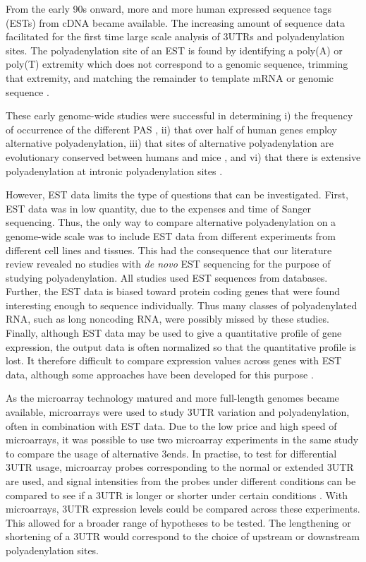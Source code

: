 From the early 90s onward, more and more human expressed sequence tags (ESTs)
from cDNA became available. The increasing amount of sequence data facilitated
for the first time large scale analysis of 3\p UTRs and polyadenylation sites.
The polyadenylation site of an EST is found by identifying a poly(A) or poly(T)
extremity which does not correspond to a genomic sequence, trimming that
extremity, and matching the remainder to template mRNA or genomic sequence
\cite{beaudoing_patterns_2000, tian_large-scale_2005}.

These early genome-wide studies were successful in determining i) the frequency
of occurrence of the different PAS \cite{beaudoing_patterns_2000}, ii) that
over half of human genes employ alternative polyadenylation, iii) that sites of
alternative polyadenylation are evolutionary conserved between humans and mice
\cite{tian_large-scale_2005}, and vi) that there is extensive polyadenylation
at intronic polyadenylation sites \cite{tian_widespread_2007}.

However, EST data limits the type of questions that can be investigated. First,
EST data was in low quantity, due to the expenses and time of Sanger
sequencing. Thus, the only way to compare alternative polyadenylation on a
genome-wide scale was to include EST data from different experiments from
different cell lines and tissues. This had the consequence that our literature
review revealed no studies with \textit{de novo} EST sequencing for the purpose
of studying polyadenylation. All studies used EST sequences from databases.
Further, the EST data is biased toward protein coding genes that were found
interesting enough to sequence individually. Thus many classes of
polyadenylated RNA, such as long noncoding RNA, were possibly missed by these
studies. Finally, although EST data may be used to give a quantitative profile
of gene expression, the output data is often normalized so that the
quantitative profile is lost. It therefore difficult to compare expression
values across genes with EST data, although some approaches have been developed
for this purpose \cite{liu_quantitative_2006}.

As the microarray technology matured and more full-length genomes became
available, microarrays were used to study 3\p UTR variation and
polyadenylation, often in combination with EST data. Due to the low price and
high speed of microarrays, it was possible to use two microarray experiments in
the same study to compare the usage of alternative 3\p ends. In practise, to
test for differential 3\p UTR usage, microarray probes corresponding to the
normal or extended 3\p UTR are used, and signal intensities from the probes
under different conditions can be compared to see if a 3\p UTR is longer or
shorter under certain conditions \cite{sandberg_proliferating_2008,
ji_progressive_2009}. With microarrays, 3\p UTR expression levels could be
compared across these experiments. This allowed for a broader range of
hypotheses to be tested. The lengthening or shortening of a 3\p UTR would
correspond to the choice of upstream or downstream polyadenylation sites.

